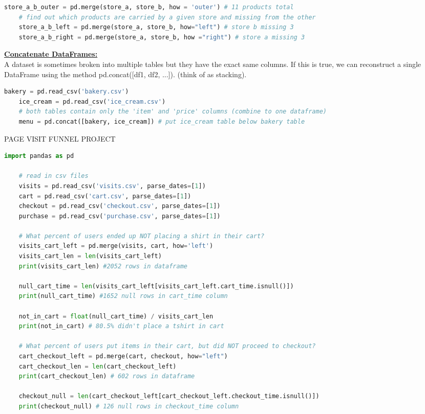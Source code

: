 \documentclass[11pt, a4paper]{article}
\begin{document}
\begin{spacing}{1.1}
\begin{lstlisting}[language=Python]
	store_a_b_outer = pd.merge(store_a, store_b, how = 'outer') # 11 products total
	# find out which products are carried by a given store and missing from the other
	store_a_b_left = pd.merge(store_a, store_b, how="left") # store b missing 3
	store_a_b_right = pd.merge(store_a, store_b, how ="right") # store a missing 3 \end{lstlisting}\vspace*{1mm}
	\underline{\textbf{Concatenate DataFrames:}} \\
	A dataset is sometimes broken into multiple tables but they have the exact same columns. If this is true, we can reconstruct a single DataFrame using the method pd.concat([df1, df2, ...]). (think of as stacking).
	\begin{lstlisting}[language=Python]
	bakery = pd.read_csv('bakery.csv')
	ice_cream = pd.read_csv('ice_cream.csv')
	# both tables contain only the 'item' and 'price' columns (combine to one dataframe)
	menu = pd.concat([bakery, ice_cream]) # put ice_cream table below bakery table \end{lstlisting}\newpage
	\noindent PAGE VISIT FUNNEL PROJECT
	\begin{lstlisting}[language=Python]
	import pandas as pd
	
	# read in csv files
	visits = pd.read_csv('visits.csv', parse_dates=[1])
	cart = pd.read_csv('cart.csv', parse_dates=[1])
	checkout = pd.read_csv('checkout.csv', parse_dates=[1])
	purchase = pd.read_csv('purchase.csv', parse_dates=[1])
	
	# What percent of users ended up NOT placing a shirt in their cart?
	visits_cart_left = pd.merge(visits, cart, how='left') 
	visits_cart_len = len(visits_cart_left)
	print(visits_cart_len) #2052 rows in dataframe
	
	null_cart_time = len(visits_cart_left[visits_cart_left.cart_time.isnull()])
	print(null_cart_time) #1652 null rows in cart_time column
	
	not_in_cart = float(null_cart_time) / visits_cart_len
	print(not_in_cart) # 80.5% didn't place a tshirt in cart
	
	# What percent of users put items in their cart, but did NOT proceed to checkout?
	cart_checkout_left = pd.merge(cart, checkout, how="left")
	cart_checkout_len = len(cart_checkout_left)
	print(cart_checkout_len) # 602 rows in dataframe
	
	checkout_null = len(cart_checkout_left[cart_checkout_left.checkout_time.isnull()])
	print(checkout_null) # 126 null rows in checkout_time column
	

\end{lstlisting}
\end{spacing}
\end{document}
